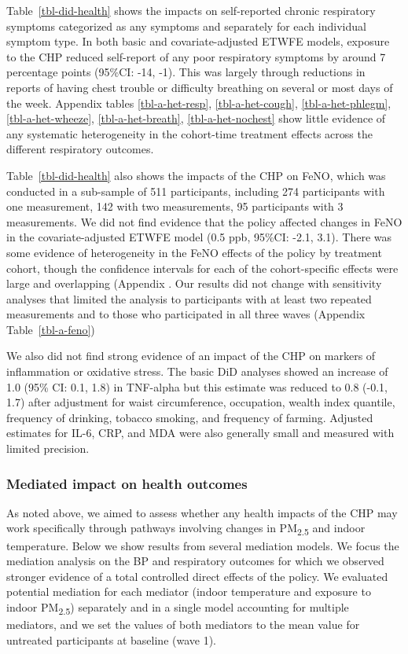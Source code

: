 \documentclass[
  letterpaper,
  DIV=11,
  numbers=noendperiod]{scrartcl}
\begin{document}
Table~\ref{tbl-did-health} shows the impacts on self-reported chronic
respiratory symptoms categorized as any symptoms and separately for each
individual symptom type. In both basic and covariate-adjusted ETWFE
models, exposure to the CHP reduced self-report of any poor respiratory
symptoms by around 7 percentage points (95\%CI: -14, -1). This was
largely through reductions in reports of having chest trouble or
difficulty breathing on several or most days of the week. Appendix
tables \ref{tbl-a-het-resp}, \ref{tbl-a-het-cough},
\ref{tbl-a-het-phlegm}, \ref{tbl-a-het-wheeze}, \ref{tbl-a-het-breath},
\ref{tbl-a-het-nochest} show little evidence of any systematic
heterogeneity in the cohort-time treatment effects across the different
respiratory outcomes.

Table~\ref{tbl-did-health} also shows the impacts of the CHP on FeNO,
which was conducted in a sub-sample of 511 participants, including 274
participants with one measurement, 142 with two measurements, 95
participants with 3 measurements. We did not find evidence that the
policy affected changes in FeNO in the covariate-adjusted ETWFE model
(0.5 ppb, 95\%CI: -2.1, 3.1). There was some evidence of heterogeneity
in the FeNO effects of the policy by treatment cohort, though the
confidence intervals for each of the cohort-specific effects were large
and overlapping (Appendix . Our results did not change with sensitivity
analyses that limited the analysis to participants with at least two
repeated measurements and to those who participated in all three waves
(Appendix Table~\ref{tbl-a-feno})

We  also did not find strong evidence of an impact of the
CHP on markers of inflammation or oxidative stress. The basic DiD
analyses showed an increase of 1.0 (95\% CI: 0.1, 1.8) in TNF-alpha but
this estimate was reduced to 0.8 (-0.1, 1.7) after adjustment for waist
circumference, occupation, wealth index quantile, frequency of drinking,
tobacco smoking, and frequency of farming. Adjusted estimates for IL-6,
CRP, and MDA were also generally small and measured with limited
precision.

\subsubsection{Mediated impact on health
outcomes}\label{mediated-impact-on-health-outcomes}

As noted above, we aimed to assess whether any health impacts of the CHP
may work specifically through pathways involving changes in
PM\textsubscript{2.5} and indoor temperature. Below we show results from
several mediation models. We focus the mediation analysis on the BP and
respiratory outcomes for which we observed stronger evidence of a total
controlled direct effects of the policy. We evaluated potential
mediation for each mediator (indoor temperature and exposure to indoor
PM\textsubscript{2.5}) separately and in a single model accounting for
multiple mediators, and we set the values of both mediators to the mean
value for untreated participants at baseline (wave 1).
\end{document}
